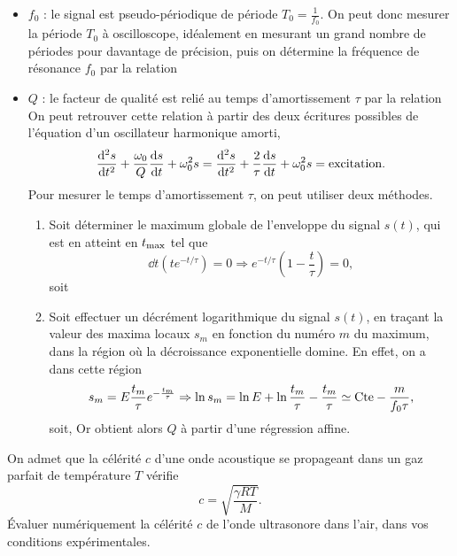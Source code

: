 \begin{protocole}
{\begin{fig}[signal]
  \end{fig}
  \begin{itemize}
    \item 
     $f_0$ : le signal est pseudo-périodique de période $T_0 = \frac{1}{f_0}$. On peut donc mesurer la période $T_0$ à oscilloscope, idéalement en mesurant un grand nombre de périodes pour davantage de précision, puis on détermine la fréquence de résonance $f_0$ par la relation
    \item {} $Q$ : le facteur de qualité est relié au temps d'amortissement $\tau$ par la relation
    On peut retrouver cette relation à partir des deux écritures possibles de l'équation d'un oscillateur harmonique amorti,
    \begin{equation*}
      \frac{\mathrm{d}^2{s}}{\mathrm{d}{t}^2} + \frac{\omega_0}{Q} \frac{\mathrm{d}{s}}{\mathrm{d}{t}} + \omega_0^2 s = \frac{\mathrm{d}^2{s}}{\mathrm{d}{t}^2} + \frac{2}{\tau} \frac{\mathrm{d}{s}}{\mathrm{d}{t}} + \omega_0^2 s = \text{excitation}.
    \end{equation*}
    Pour mesurer le temps d'amortissement $\tau$, on peut utiliser deux méthodes.
    \begin{enumerate}
      \item Soit déterminer le maximum globale de l'enveloppe du signal $s(t)$, qui est en atteint en $t_{\rm max}$ tel que 
      $$
      \dd{}{t} \left( t e^{-t/\tau} \right)= 0 \Rightarrow   e^{-t/\tau} \left( 1-\frac{t}{\tau} \right) = 0,
      $$
      soit 
      \item Soit effectuer un décrément logarithmique du signal $s(t)$, en traçant la valeur des maxima locaux $s_m$ en fonction du numéro $m$ du maximum, dans la région où la décroissance exponentielle domine. En effet, on a dans cette région 
      $$
      s_m = E \frac{t_m}{\tau} e^{-\frac{t_m}{\tau}} \Rightarrow \ln s_m = \ln E + \ln \frac{t_m}{\tau} - \frac{t_m}{\tau} \simeq \text{Cte} - \frac{m}{f_0 \tau},
      $$
      soit,
      Or obtient alors $Q$ à partir d'une régression affine.
    \end{enumerate}
  \end{itemize}
 }

  \item\label{quest:c} On admet que la célérité $c$ d'une onde acoustique se propageant dans un gaz parfait de température $T$ vérifie 
  \begin{equation*}\label{eq:c}
    c = \sqrt{\frac{\gamma RT}{M}}.
  \end{equation*}
  Évaluer numériquement la célérité $c$ de l'onde ultrasonore dans l'air, dans vos conditions expérimentales.
\end{protocole}
